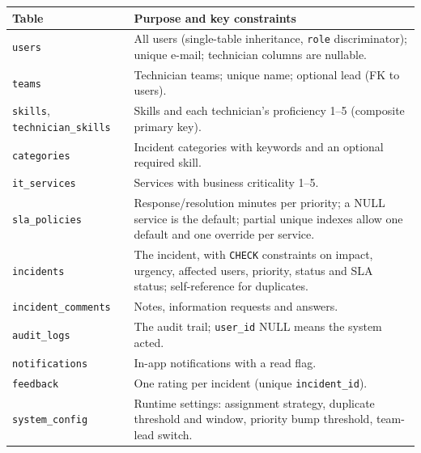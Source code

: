 \documentclass[11pt,a4paper]{article}
\begin{document}
\begin{tabularx}{\linewidth}{@{}lX@{}}
\toprule
\textbf{Table} & \textbf{Purpose and key constraints} \\ \midrule
\texttt{users} & All users (single-table inheritance, \texttt{role} discriminator); unique e-mail; technician columns are nullable. \\
\texttt{teams} & Technician teams; unique name; optional lead (FK to users). \\
\texttt{skills}, \texttt{technician\_skills} & Skills and each technician's proficiency 1–5 (composite primary key). \\
\texttt{categories} & Incident categories with keywords and an optional required skill. \\
\texttt{it\_services} & Services with business criticality 1–5. \\
\texttt{sla\_policies} & Response/resolution minutes per priority; a NULL service is the default; partial unique indexes allow one default and one override per service. \\
\texttt{incidents} & The incident, with \texttt{CHECK} constraints on impact, urgency, affected users, priority, status and SLA status; self-reference for duplicates. \\
\texttt{incident\_comments} & Notes, information requests and answers. \\
\texttt{audit\_logs} & The audit trail; \texttt{user\_id} NULL means the system acted. \\
\texttt{notifications} & In-app notifications with a read flag. \\
\texttt{feedback} & One rating per incident (unique \texttt{incident\_id}). \\
\texttt{system\_config} & Runtime settings: assignment strategy, duplicate threshold and window, priority bump threshold, team-lead switch. \\ \bottomrule
\end{tabularx}
\end{document}
